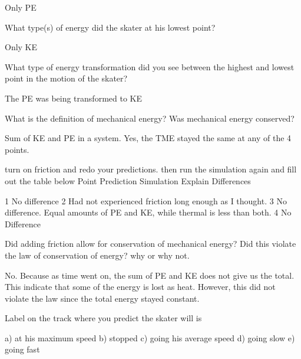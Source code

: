 \documentclass[]{exam}
\begin{document}
\begin{questions}
\begin{questions}
\begin{solution}
    Only PE
\end{solution}
    
\question    
What type(s) of energy did the skater at his lowest point?

\begin{solution}
    Only KE
\end{solution}

\question   
What type of energy transformation did you see between the highest and lowest point in the motion of the skater? 

\begin{solution}
    The PE was being transformed to KE
\end{solution}

\question
What is the definition of mechanical energy? Was mechanical energy conserved?

\begin{solution}
    Sum of KE and PE in a system. Yes, the TME stayed the same at any of the 4 points.
\end{solution}

\question
turn on friction and redo your predictions. then run the simulation again and fill out the table below
Point	Prediction	Simulation	Explain Differences

\begin{solution}
1	
 	No difference
2	
 	Had not experienced friction long enough as I thought.
3	
 	No difference. Equal amounts of PE and KE, while thermal is less than both.
4	
 	No Difference
\end{solution}

\question
Did adding friction allow for conservation of mechanical energy? Did this violate the law of conservation of energy? why or why not.

\begin{solution}
    No. Because as time went on, the sum of PE and KE does not give us the total. This indicate that some of the energy is lost as heat. However, this did not violate the law since the total energy stayed constant.
\end{solution}


\question
Label on the track where you predict the skater will is 

a) at his maximum speed
b) stopped
c) going his average speed
d) going slow
e) going fast


\end{questions}
\end{questions}
\end{document}
